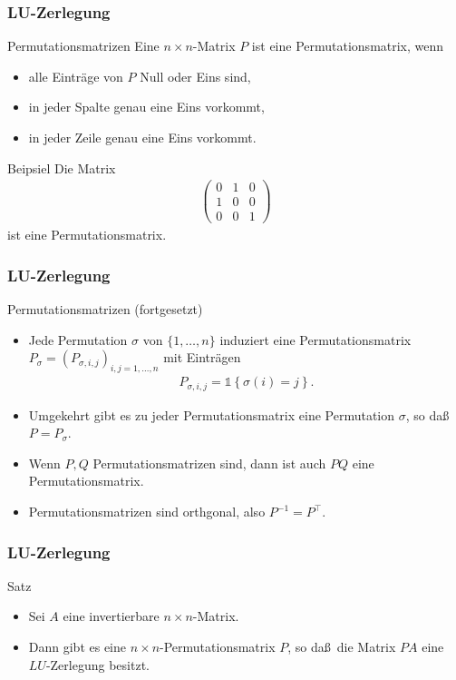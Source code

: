 \documentclass{beamer}
\newcommand\cbc[1]{\left\{{#1}\right\}}
\newcommand{\vecone}{\mathbb{1}}
\newcommand{\trans}{\top}
\renewcommand{\ae}{\"a}
\newcommand{\mytitle}{LU-Zerlegung}
\begin{document}
\begin{frame}\frametitle{\mytitle}
	\begin{block}{Permutationsmatrizen}
		Eine $n\times n$-Matrix $P$ ist eine Permutationsmatrix, wenn
		\begin{itemize}
			\item alle Eintr\ae ge von $P$ Null oder Eins sind,
			\item in jeder Spalte genau eine Eins vorkommt,
			\item in jeder Zeile genau eine Eins vorkommt.
		\end{itemize}
	\end{block}
	\begin{block}{Beipsiel}
		Die Matrix
		\begin{align*}
			\begin{pmatrix}
				0&1&0\\1&0&0\\0&0&1
			\end{pmatrix}
		\end{align*}
		ist eine Permutationsmatrix.
	\end{block}
\end{frame}

\begin{frame}\frametitle{\mytitle}
	\begin{block}{Permutationsmatrizen (fortgesetzt)}
		\begin{itemize}
			\item Jede Permutation $\sigma$ von $\{1,\ldots,n\}$ induziert eine Permutationsmatrix $P_\sigma=(P_{\sigma,i,j})_{i,j=1,\ldots,n}$ mit Eintr\ae gen
				\begin{align*}
					P_{\sigma,i,j}=\vecone\cbc{\sigma(i)=j}.
				\end{align*}
			\item Umgekehrt gibt es zu jeder Permutationsmatrix eine Permutation $\sigma$, so da\ss\ $P=P_\sigma$.
			\item Wenn $P,Q$ Permutationsmatrizen sind, dann ist auch $PQ$ eine Permutationsmatrix.
			\item Permutationsmatrizen sind orthgonal, also $P^{-1}=P^\trans$.
		\end{itemize}
	\end{block}
\end{frame}

\begin{frame}\frametitle{\mytitle}
	\begin{block}{Satz}
		\begin{itemize}
			\item Sei $A$ eine invertierbare $n\times n$-Matrix.
			\item Dann gibt es eine $n\times n$-Permutationsmatrix $P$, so da\ss\ die Matrix $PA$ eine $LU$-Zerlegung besitzt.
		\end{itemize}
	\end{block}
\end{frame}
\end{document}
